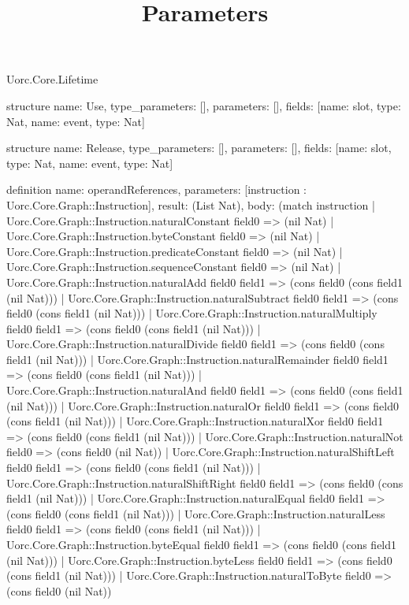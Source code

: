 \begin{lexlean}{Uorc.Core.Lifetime}
\title{Parameters}
\begin{semanticmodule}
structure{
  name: Use,
  type_parameters: [],
  parameters: [],
  fields: [{name: slot, type: Nat}, {name: event, type: Nat}]
}

structure{
  name: Release,
  type_parameters: [],
  parameters: [],
  fields: [{name: slot, type: Nat}, {name: event, type: Nat}]
}

definition{
  name: operandReferences,
  parameters: [instruction : Uorc.Core.Graph::Instruction],
  result: (List Nat),
  body: (match instruction
    | Uorc.Core.Graph::Instruction.naturalConstant field0 => (nil Nat)
    | Uorc.Core.Graph::Instruction.byteConstant field0 => (nil Nat)
    | Uorc.Core.Graph::Instruction.predicateConstant field0 => (nil Nat)
    | Uorc.Core.Graph::Instruction.sequenceConstant field0 => (nil Nat)
    | Uorc.Core.Graph::Instruction.naturalAdd field0 field1 => (cons field0 (cons field1 (nil Nat)))
    | Uorc.Core.Graph::Instruction.naturalSubtract field0 field1 => (cons field0 (cons field1 (nil Nat)))
    | Uorc.Core.Graph::Instruction.naturalMultiply field0 field1 => (cons field0 (cons field1 (nil Nat)))
    | Uorc.Core.Graph::Instruction.naturalDivide field0 field1 => (cons field0 (cons field1 (nil Nat)))
    | Uorc.Core.Graph::Instruction.naturalRemainder field0 field1 => (cons field0 (cons field1 (nil Nat)))
    | Uorc.Core.Graph::Instruction.naturalAnd field0 field1 => (cons field0 (cons field1 (nil Nat)))
    | Uorc.Core.Graph::Instruction.naturalOr field0 field1 => (cons field0 (cons field1 (nil Nat)))
    | Uorc.Core.Graph::Instruction.naturalXor field0 field1 => (cons field0 (cons field1 (nil Nat)))
    | Uorc.Core.Graph::Instruction.naturalNot field0 => (cons field0 (nil Nat))
    | Uorc.Core.Graph::Instruction.naturalShiftLeft field0 field1 => (cons field0 (cons field1 (nil Nat)))
    | Uorc.Core.Graph::Instruction.naturalShiftRight field0 field1 => (cons field0 (cons field1 (nil Nat)))
    | Uorc.Core.Graph::Instruction.naturalEqual field0 field1 => (cons field0 (cons field1 (nil Nat)))
    | Uorc.Core.Graph::Instruction.naturalLess field0 field1 => (cons field0 (cons field1 (nil Nat)))
    | Uorc.Core.Graph::Instruction.byteEqual field0 field1 => (cons field0 (cons field1 (nil Nat)))
    | Uorc.Core.Graph::Instruction.byteLess field0 field1 => (cons field0 (cons field1 (nil Nat)))
    | Uorc.Core.Graph::Instruction.naturalToByte field0 => (cons field0 (nil Nat))
}
\end{semanticmodule}
\end{lexlean}
